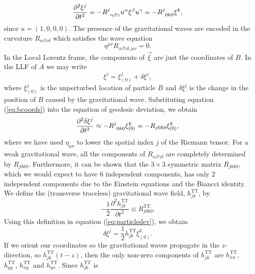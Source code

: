 \begin{equation}
\frac{\partial^2 \xi^{j}}{\partial t^2} = -
\tensor{R}{^j_{\alpha\beta\gamma}}u^\alpha\xi^\beta u^\gamma =
-\tensor{R}{^j_{0k0}} \xi^k,
\end{equation}
since $u = (1,0,0,0)$.  The presence of the gravitational waves are encoded in
the curvature $R_{\alpha\beta\gamma\delta}$ which satisfies the wave equation
\begin{equation}
\eta^{\mu\nu}R_{\alpha\beta\gamma\delta,\mu\nu} = 0.
\end{equation}
In the Local Lorentz frame, the components of $\vec{\xi}$ are just the
coordinates of $B$.  
In the LLF of $A$ we may write
\begin{equation}
\label{eq:bcoords}
\xi^j = \xi_{(0)}^j + \delta \xi^j,
\end{equation}
where $\xi_{(0)}^j$ is the unperturbed location of particle $B$ and $\delta
\xi^j$ is the change in the position of $B$ caused by the gravitational wave.
Substituting equation (\ref{eq:bcoords}) into the equation of geodesic
deviation, we obtain
\begin{equation}
\label{eq:particledev}
\frac{\partial^2 \delta \xi^j}{\partial t^2} \approx - \tensor{R}{^j_{0k0}} \xi_{(0)}^k =
-R_{j0k0} \xi_{(0)}^k,
\end{equation}
where we have used $\eta_{\mu\nu}$ to lower the spatial index $j$ of the
Riemann tensor. For a weak gravitational wave, all the components of
$R_{\alpha\beta\gamma\delta}$ are completely determined by $R_{j0k0}$.
Furthermore, it can be shown that the $3\times3$ symmetric matrix $R_{j0k0}$,
which we would expect to have $6$ independent components, has only $2$
independent components due to the Einstein equations and the Biancci identity.
We define the (transverse traceless) gravitational wave field,
$h_{jk}^\mathrm{TT}$, by
\begin{equation}
-\frac{1}{2} \frac{\partial^2 h_{jk}^\mathrm{TT}}{\partial t^2} \equiv
R_{j0k0}^\mathrm{TT}.
\label{eq:hjkdef}
\end{equation}
Using this definition in equation (\ref{eq:particledev}), we obtain
\begin{equation}
\delta \xi^j = \frac{1}{2} h_{jk}^\mathrm{TT} \xi_{(0)}^k.
\label{eq:gwxeffect}
\end{equation}
If we orient our coordinates so the gravitational waves propagate in the
$z$-direction, so $h_{jk}^\mathrm{TT}(t-z)$, then the only non-zero components
of $h_{jk}^\mathrm{TT}$ are $h_{xx}^\mathrm{TT}$, $h_{yy}^\mathrm{TT}$,
$h_{xy}^\mathrm{TT}$ and $h_{yx}^\mathrm{TT}$. Since $h_{jk}^\mathrm{TT}$ is
